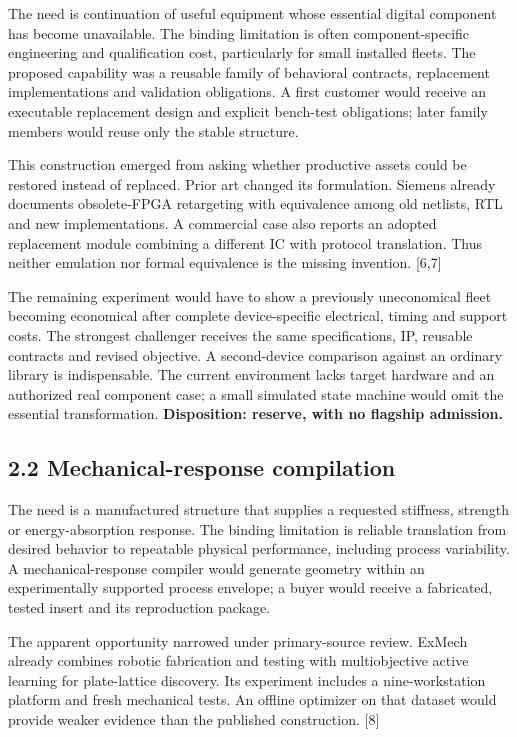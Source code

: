 \documentclass[11pt,letterpaper]{article}
\begin{document}
The need is continuation of useful equipment whose essential digital component has become unavailable. The binding limitation is often component-specific engineering and qualification cost, particularly for small installed fleets. The proposed capability was a reusable family of behavioral contracts, replacement implementations and validation obligations. A first customer would receive an executable replacement design and explicit bench-test obligations; later family members would reuse only the stable structure.

This construction emerged from asking whether productive assets could be restored instead of replaced. Prior art changed its formulation. Siemens already documents obsolete-FPGA retargeting with equivalence among old netlists, RTL and new implementations. A commercial case also reports an adopted replacement module combining a different IC with protocol translation. Thus neither emulation nor formal equivalence is the missing invention. {[}6,7{]}

The remaining experiment would have to show a previously uneconomical fleet becoming economical after complete device-specific electrical, timing and support costs. The strongest challenger receives the same specifications, IP, reusable contracts and revised objective. A second-device comparison against an ordinary library is indispensable. The current environment lacks target hardware and an authorized real component case; a small simulated state machine would omit the essential transformation. \textbf{Disposition: reserve, with no flagship admission.}

\hypertarget{mechanical-response-compilation}{%
\subsection{2.2 Mechanical-response compilation}\label{mechanical-response-compilation}}

The need is a manufactured structure that supplies a requested stiffness, strength or energy-absorption response. The binding limitation is reliable translation from desired behavior to repeatable physical performance, including process variability. A mechanical-response compiler would generate geometry within an experimentally supported process envelope; a buyer would receive a fabricated, tested insert and its reproduction package.

The apparent opportunity narrowed under primary-source review. ExMech already combines robotic fabrication and testing with multiobjective active learning for plate-lattice discovery. Its experiment includes a nine-workstation platform and fresh mechanical tests. An offline optimizer on that dataset would provide weaker evidence than the published construction. {[}8{]}
\end{document}
